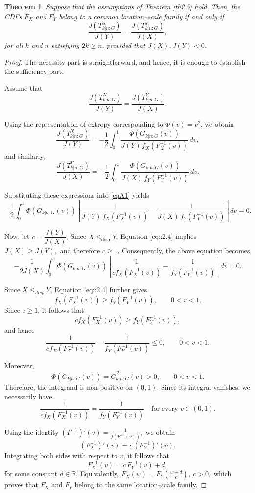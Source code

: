 \documentclass[12pt,a4paper]{article}
\numberwithin{equation}{section}
\newtheorem{theorem}{Theorem}[section]
\begin{document}
\begin{theorem}
Suppose that the assumptions of Theorem \ref{th2.5} hold. Then, the CDFs $F_X$ and $F_Y$ belong to a common location--scale family
if and only if
\begin{equation*}
\frac{J(T_{k|n:G}^{X})}{J(Y)}
=
\frac{J(T_{k|n:G}^{Y})}{J(X)},
\end{equation*}
for all $k$ and $n$ satisfying $2k\ge n$, provided that $J(X),J(Y)<0$.
\end{theorem}

\begin{proof}
The necessity part is straightforward, and hence, it is enough to establish the sufficiency part.

Assume that
\begin{equation}\label{eqA1}
\frac{J(T_{k|n:G}^{X})}{J(Y)}
=
\frac{J(T_{k|n:G}^{Y})}{J(X)}.
\end{equation}

Using the representation of extropy corresponding to $\Phi(v)=v^2$, we obtain
$$
\frac{J(T_{k|n:G}^{X})}{J(Y)}
=
-\frac12
\int_0^1
\frac{\Phi(\overline G_{k|n:G}(v))}
{J(Y)\,f_X(F_X^{-1}(v))}\,dv,
$$
and similarly,
$$
\frac{J(T_{k|n:G}^{Y})}{J(X)}
=
-\frac12
\int_0^1
\frac{\Phi(\overline G_{k|n:G}(v))}
{J(X)\,f_Y(F_Y^{-1}(v))}\,dv.
$$

Substituting these expressions into \eqref{eqA1} yields
$$
-\frac12
\int_0^1
\Phi(\overline G_{k|n:G}(v))
\left[
\frac{1}{J(Y)\,f_X(F_X^{-1}(v))}
-
\frac{1}{J(X)\,f_Y(F_Y^{-1}(v))}
\right]dv
=0.
$$

Now, let
$
c=\dfrac{J(Y)}{J(X)}.
$
Since $X\leq_{\mathrm{disp}}Y$, Equation \eqref{eq::2.4} implies
$
J(X)\ge J(Y),
$
and therefore $c\ge1$. Consequently, the above equation becomes
$$
-\frac{1}{2J(X)}
\int_0^1
\Phi(\overline G_{k|n:G}(v))
\left[
\frac{1}{cf_X(F_X^{-1}(v))}
-
\frac{1}{f_Y(F_Y^{-1}(v))}
\right]dv
=0.
$$

Since $X\leq_{disp}Y$, Equation \eqref{eq::2.4} further gives
$$
f_X(F_X^{-1}(v))
\ge
f_Y(F_Y^{-1}(v)),
\qquad 0<v<1.
$$
Since $c\ge1$, it follows that
$$
cf_X(F_X^{-1}(v))
\ge
f_Y(F_Y^{-1}(v)),
$$
and hence
$$
\frac1{cf_X(F_X^{-1}(v))}
-
\frac1{f_Y(F_Y^{-1}(v))}
\leq 0,
\qquad 0<v<1.
$$

Moreover,
$$
\Phi(\overline G_{k|n:G}(v))
=
\overline G_{k|n:G}^{\,2}(v)>0,
\qquad 0<v<1.
$$
Therefore, the integrand is non-positive on $(0,1)$. Since its integral vanishes, we necessarily have
$$
\frac{1}{cf_X(F_X^{-1}(v))}
=
\frac{1}{f_Y(F_Y^{-1}(v))}
\quad \text{for every } v\in(0,1).
$$

Using the identity $(F^{-1})'(v)=\frac1{f(F^{-1}(v))},$ we obtain
$$
(F_X^{-1})'(v)
=
c\,(F_Y^{-1})'(v).
$$
Integrating both sides with respect to $v$, it follows that
$$
F_X^{-1}(v)
=
c\,F_Y^{-1}(v)+d,
$$
for some constant $d\in\mathbb{R}$. Equivalently,
$
F_X(w)
=
F_Y\!\left(\frac{w-d}{c}\right),~ c>0,
$
which proves that $F_X$ and $F_Y$ belong to the same location--scale family.
\end{proof}
\end{document}
